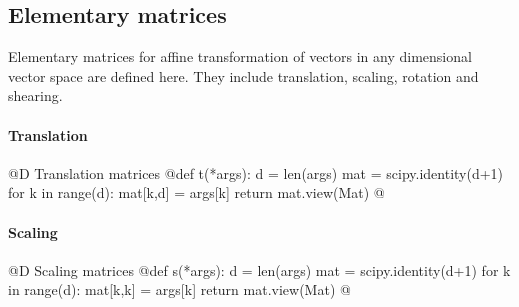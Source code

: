 \documentclass[11pt,oneside]{article}	%
\begin{document}
\subsection{Elementary matrices}
Elementary matrices for affine transformation of vectors in any dimensional vector space are defined here. They include translation, scaling, rotation and shearing. 

\paragraph{Translation}
@D Translation matrices
@{def t(*args): 
	d = len(args)
	mat = scipy.identity(d+1)
	for k in range(d): 
		mat[k,d] = args[k]
	return mat.view(Mat)
@}
\paragraph{Scaling}
@D Scaling matrices
@{def s(*args): 
	d = len(args)
	mat = scipy.identity(d+1)
	for k in range(d): 
		mat[k,k] = args[k]
	return mat.view(Mat)
@}
\end{document}
